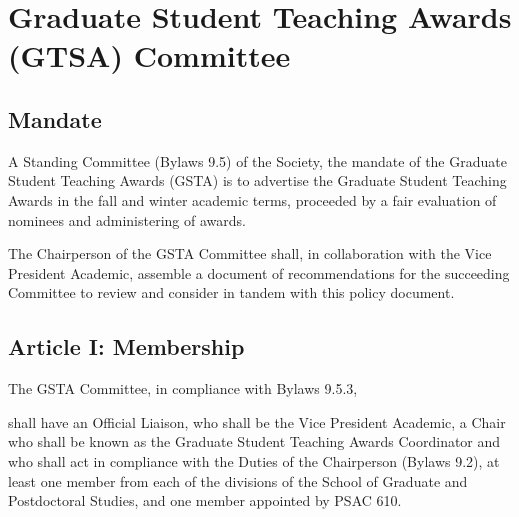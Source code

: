 \section{Graduate Student Teaching Awards (GTSA) Committee}

\subsection{Mandate}
A Standing Committee (Bylaws 9.5) of the Society, the mandate of the Graduate Student Teaching Awards (GSTA) is to advertise the Graduate Student Teaching Awards in the fall and winter academic terms, proceeded by a fair evaluation of nominees and administering of awards.\newline 

The Chairperson of the GSTA Committee shall, in collaboration with the Vice President Academic, assemble a document of recommendations for the succeeding Committee to review and consider in tandem with this policy document. \newline

\subsection{Article I: Membership}   
\begin{longenum}[ label*=\thesubsection.\arabic*., align=left] 
\item The GSTA Committee, in compliance with Bylaws 9.5.3,
	\begin{longenum}[ label*=\arabic*., align=left]
	\item shall have an Official Liaison, who shall be the Vice President Academic, a Chair who shall be known as the Graduate Student Teaching Awards Coordinator and who shall act in compliance with the Duties of the Chairperson (Bylaws 9.2), at least one member from each of the divisions of the School of Graduate and Postdoctoral Studies, and one member appointed by PSAC 610.
	\end{longenum}
\end{longenum}

